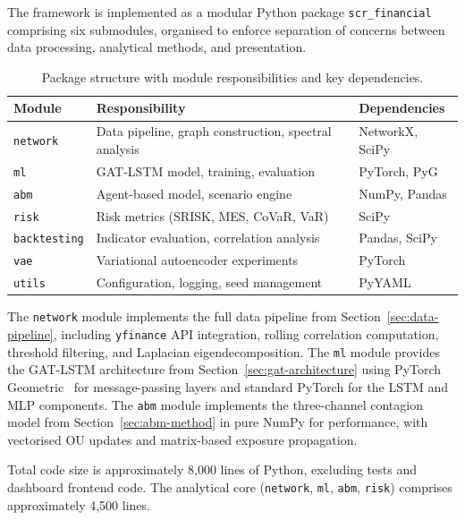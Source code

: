 The framework is implemented as a modular Python package \texttt{scr\_financial} comprising six submodules, organised to enforce separation of concerns between data processing, analytical methods, and presentation.

\begin{table}[H]
\centering
\caption{Package structure with module responsibilities and key dependencies.}
\label{tab:modules}
\small
\begin{tabularx}{\textwidth}{lXl}
\toprule
\textbf{Module} & \textbf{Responsibility} & \textbf{Dependencies} \\
\midrule
\texttt{network} & Data pipeline, graph construction, spectral analysis & NetworkX, SciPy \\
\texttt{ml}      & GAT-LSTM model, training, evaluation & PyTorch, PyG~\cite{fey2019fast} \\
\texttt{abm}     & Agent-based model, scenario engine & NumPy, Pandas \\
\texttt{risk}    & Risk metrics (SRISK, MES, CoVaR, VaR) & SciPy \\
\texttt{backtesting} & Indicator evaluation, correlation analysis & Pandas, SciPy \\
\texttt{vae}     & Variational autoencoder experiments & PyTorch \\
\texttt{utils}   & Configuration, logging, seed management & PyYAML \\
\bottomrule
\end{tabularx}
\normalsize
\end{table}

The \texttt{network} module implements the full data pipeline from Section~\ref{sec:data-pipeline}, including \texttt{yfinance} API integration, rolling correlation computation, threshold filtering, and Laplacian eigendecomposition. The \texttt{ml} module provides the GAT-LSTM architecture from Section~\ref{sec:gat-architecture} using PyTorch Geometric~\cite{fey2019fast} for message-passing layers and standard PyTorch for the LSTM and MLP components. The \texttt{abm} module implements the three-channel contagion model from Section~\ref{sec:abm-method} in pure NumPy for performance, with vectorised OU updates and matrix-based exposure propagation.

Total code size is approximately 8,000 lines of Python, excluding tests and dashboard frontend code. The analytical core (\texttt{network}, \texttt{ml}, \texttt{abm}, \texttt{risk}) comprises approximately 4,500 lines.


